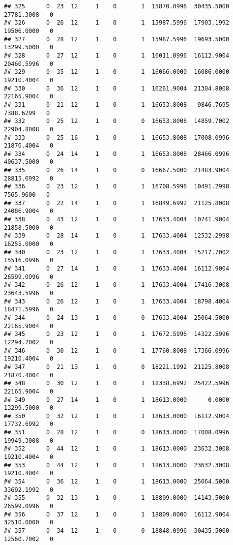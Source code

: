 \documentclass[
]{article}
\begin{document}
\begin{enumerate}
\begin{verbatim}
## 325      0  23  12     1    0       1  15870.0996  30435.5000  27781.3008   0
## 326      0  26  12     1    0       1  15987.5996  17903.1992  19506.0000   0
## 327      0  28  12     1    0       1  15987.5996  19693.5000  13299.5000   0
## 328      0  27  12     1    0       1  16011.0996  16112.9004  20460.5996   0
## 329      0  35  12     1    0       1  16066.0000  16086.0000  19210.4004   0
## 330      0  36  12     1    0       1  16261.9004  21304.8008  22165.9004   0
## 331      0  21  12     1    0       1  16653.8008   9846.7695   7388.6299   0
## 332      0  25  12     1    0       0  16653.8008  14859.7002  22904.8008   0
## 333      0  25  16     1    0       1  16653.8008  17008.0996  21870.4004   0
## 334      0  24  14     1    0       1  16653.8008  28466.0996  40637.5000   0
## 335      0  26  14     1    0       0  16667.5000  21483.9004  28815.6992   0
## 336      0  23  12     1    0       1  16708.5996  10491.2998   7565.9600   0
## 337      0  22  14     1    0       1  16849.6992  21125.8008  24086.9004   0
## 338      0  43  12     1    0       1  17633.4004  10741.9004  21858.5000   0
## 339      0  28  14     1    0       1  17633.4004  12532.2998  16255.0000   0
## 340      0  23  12     1    0       1  17633.4004  15217.7002  15516.0996   0
## 341      0  27  14     1    0       1  17633.4004  16112.9004  26599.0996   0
## 342      0  26  12     1    0       1  17633.4004  17416.3008  23643.5996   0
## 343      0  26  12     1    0       1  17633.4004  18798.4004  18471.5996   0
## 344      0  24  13     1    0       0  17633.4004  25064.5000  22165.9004   0
## 345      0  23  12     1    0       1  17672.5996  14322.5996  12294.7002   0
## 346      0  30  12     1    0       1  17760.8008  17366.0996  19210.4004   0
## 347      0  21  13     1    0       0  18221.1992  21125.8008  21870.4004   0
## 348      0  30  12     1    0       1  18338.6992  25422.5996  22165.9004   0
## 349      0  27  14     1    0       1  18613.0000      0.0000  13299.5000   0
## 350      0  32  12     1    0       1  18613.0000  16112.9004  17732.6992   0
## 351      0  28  12     1    0       0  18613.0000  17008.0996  19949.3008   0
## 352      0  44  12     1    0       1  18613.0000  23632.3008  19210.4004   0
## 353      0  44  12     1    0       1  18613.0000  23632.3008  19210.4004   0
## 354      0  36  12     1    0       1  18613.0000  25064.5000  33692.1992   0
## 355      0  32  13     1    0       1  18809.0000  14143.5000  26599.0996   0
## 356      0  37  12     1    0       1  18809.0000  16112.9004  32510.0000   0
## 357      0  34  12     1    0       0  18848.0996  30435.5000  12560.7002   0

\end{verbatim}
\end{enumerate}
\end{document}
